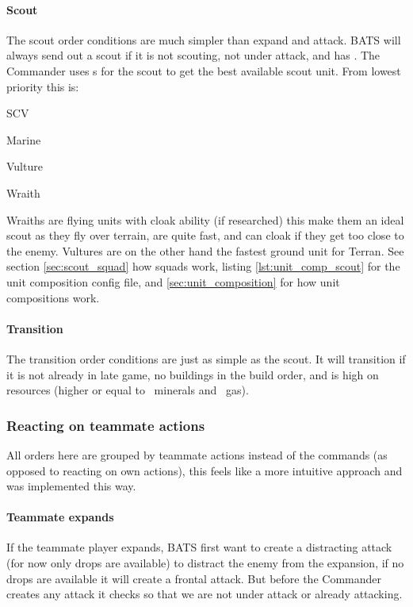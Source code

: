 \paragraph{Scout}
The scout order conditions are much simpler than expand and attack. BATS will always send out a
scout if it is not scouting, not under attack, and has \CommanderScoutOnWorkerCount. The Commander
uses s for the scout to get the best available scout unit. From lowest
priority this is:
\vspace{0.5em}
\begin{compactenum}
  \item SCV
	\item Marine
	\item Vulture
	\item Wraith
\end{compactenum}
Wraiths are flying units with cloak ability (if researched) this make them an ideal scout as they
fly over terrain, are quite fast, and can cloak if they get too close to the enemy. Vultures are on
the other hand the fastest ground unit for Terran. See section \ref{sec:scout_squad} how squads
work, listing \ref{lst:unit_comp_scout} for the unit composition config file, and
\ref{sec:unit_composition} for how unit compositions work.

\paragraph{Transition}
The transition order conditions are just as simple as the scout. It will transition if it is not
already in late game, no buildings in the build order, and is high on resources (higher or equal to
\classificationHighOnMinerals~minerals and \classificationHighOnGas~gas).

\subsubsection{Reacting on teammate actions} All orders here are grouped by teammate actions instead of
the commands (as opposed to reacting on own actions), this feels like a more intuitive approach and
was implemented this way.

\paragraph{Teammate expands} If the teammate player expands, BATS first want to create a distracting
attack (for now only drops are available) to distract the enemy from the expansion, if no drops are
available it will create a frontal attack. But before the Commander creates any attack it checks so
that we are not under attack or already attacking.

